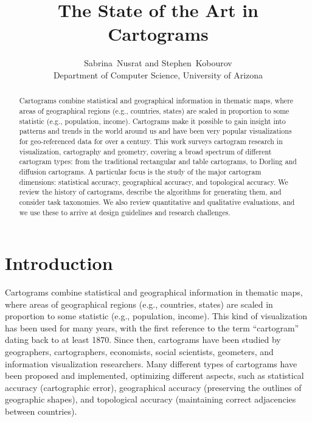 \documentclass{egpubl}
\title {The State of the Art in Cartograms
}
\author[S. Nusrat  and S. Kobourov]
{
Sabrina~Nusrat and 
Stephen~Kobourov\\
Department of Computer Science, University of Arizona
}
\begin{document}
\maketitle

\begin{abstract}
   Cartograms combine statistical and geographical information in thematic maps, where areas of geographical regions (e.g., countries, states) are scaled in proportion to some statistic (e.g., population, income).  Cartograms make it possible to gain insight into patterns and trends in the world around us and have been very popular visualizations for geo-referenced data for over a century. 
   This work surveys cartogram research in visualization, cartography and geometry, covering a broad spectrum of different cartogram types: from the traditional rectangular and table cartograms, to Dorling and diffusion cartograms. A particular focus is the study of the major cartogram dimensions: statistical accuracy, geographical accuracy, and topological accuracy. We review the history of cartograms, describe the algorithms for generating them, and consider task taxonomies. We also review quantitative and qualitative evaluations, and we use these to arrive at design guidelines and research challenges.





\end{abstract}





\section{Introduction}
Cartograms combine statistical and geographical information in thematic maps, where areas of geographical regions (e.g., countries, states) are scaled in proportion to some statistic (e.g., population, income). 
This kind of visualization has been used for many years, with the first reference to the term ``cartogram'' dating back to at least 1870. 
Since then, cartograms have been studied by geographers, cartographers, economists, social scientists, geometers, and information visualization researchers. Many different types of cartograms have been proposed and implemented, optimizing different aspects, such as statistical accuracy (cartographic error), geographical accuracy (preserving the outlines of geographic shapes), and topological accuracy (maintaining correct adjacencies between countries).
\end{document}
